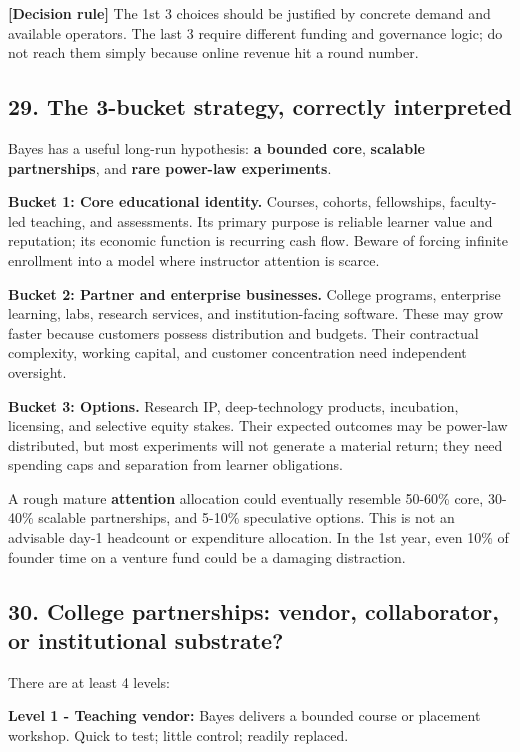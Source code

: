 \textbf{\textbf{[Decision rule]}} The 1st 3 choices should be justified by concrete demand and available operators. The last 3 require different funding and governance logic; do not reach them simply because online revenue hit a round number.

\subsection{29. The 3-bucket strategy, correctly interpreted}

Bayes has a useful long-run hypothesis: \textbf{a bounded core}, \textbf{scalable partnerships}, and \textbf{rare power-law experiments}.

\textbf{Bucket 1: Core educational identity.} Courses, cohorts, fellowships, faculty-led teaching, and assessments. Its primary purpose is reliable learner value and reputation; its economic function is recurring cash flow. Beware of forcing infinite enrollment into a model where instructor attention is scarce.

\textbf{Bucket 2: Partner and enterprise businesses.} College programs, enterprise learning, labs, research services, and institution-facing software. These may grow faster because customers possess distribution and budgets. Their contractual complexity, working capital, and customer concentration need independent oversight.

\textbf{Bucket 3: Options.} Research IP, deep-technology products, incubation, licensing, and selective equity stakes. Their expected outcomes may be power-law distributed, but most experiments will not generate a material return; they need spending caps and separation from learner obligations.

A rough mature \textbf{attention} allocation could eventually resemble 50-60\% core, 30-40\% scalable partnerships, and 5-10\% speculative options. This is not an advisable day-1 headcount or expenditure allocation. In the 1st year, even 10\% of founder time on a venture fund could be a damaging distraction.

\subsection{30. College partnerships: vendor, collaborator, or institutional substrate?}

There are at least 4 levels:

\textbf{Level 1 - Teaching vendor:} Bayes delivers a bounded course or placement workshop. Quick to test; little control; readily replaced.

